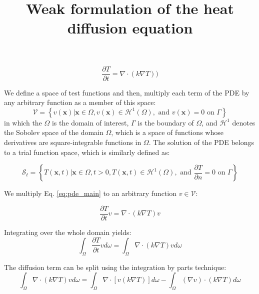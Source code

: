 \documentclass[12pt,a4paper]{article}
\title{Weak formulation of the heat diffusion equation}
\date{}
\begin{document}
\maketitle

\onehalfspacing

\begin{equation} \label{eq:pde_main}
\frac{\partial T}{\partial t}=\nabla \cdot\left(k \nabla T\right))
\end{equation}

We define a space of test functions and then, multiply each term of the PDE by any arbitrary function as a member of this space:
\begin{equation} \label{eq:function_space}
\mathcal{V}=\left\{v(\mathbf{x}) | \mathbf{x} \in {\Omega}, v(\mathbf{x}) \in \mathcal{H}^{1}(\Omega), \text { and } v(\mathbf{x})=0 \text { on } \Gamma\right\}
\end{equation}
in which the $\Omega$ is the domain of interest, $\Gamma$ is the boundary of $\Omega$, and $\mathcal{H}^{1}$ denotes the Sobolev space of the domain $\Omega$, which is a space of functions whose derivatives are square-integrable functions in $\Omega$. The solution of the PDE belongs to a trial function space, which is similarly defined as:

\begin{equation} \label{eq:trial_domain}
\mathcal{S}_{t}=\left\{T(\mathbf{x}, t) | \mathbf{x} \in \Omega, t>0, T(\mathbf{x}, t) \in \mathcal{H}^{1}(\Omega), \text { and } \frac{\partial T}{\partial n}=0 \text { on } \Gamma\right\}
\end{equation}

We multiply Eq. \ref{eq:pde_main} to an arbitrary function $v \in \mathcal{V}$:

\begin{equation}
\frac{\partial T}{\partial t}v=\nabla \cdot\left(k \nabla T\right)v
\end{equation}

\noindent Integrating over the whole domain yields:
\begin{equation} \label{eq:int_first}
\int_{\Omega} \frac{\partial T}{\partial t} v d \omega=\int_{\Omega} \nabla \cdot (k  \nabla T) v d \omega
\end{equation}

\noindent The diffusion term can be split using the integration by parts technique:
\begin{equation} \label{eq:int_part}
\int_{\Omega} \nabla \cdot (k  \nabla T) v d \omega = \int_{\Omega} \nabla \cdot[v(k  \nabla T)] d \omega-\int_{\Omega} (\nabla v) \cdot(k  \nabla T) d \omega
\end{equation}
\end{document}
